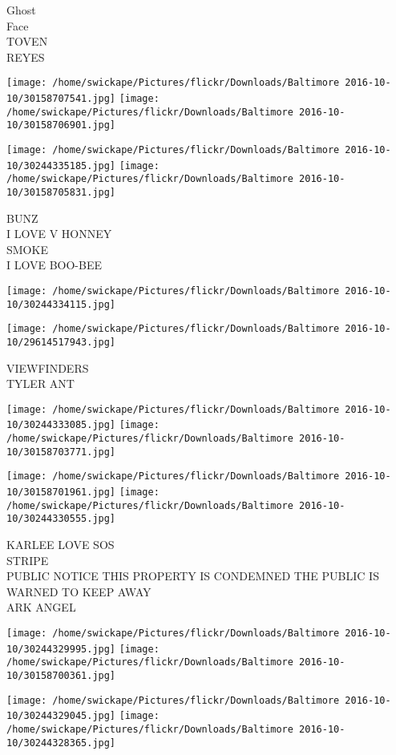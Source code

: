 \documentclass[10pt,letterpaper]{article}
\begin{document}
Ghost\\
Face\\
TOVEN\\
REYES
\pagebreak

\texttt{[image: /home/swickape/Pictures/flickr/Downloads/Baltimore 2016-10-10/30158707541.jpg]}
\texttt{[image: /home/swickape/Pictures/flickr/Downloads/Baltimore 2016-10-10/30158706901.jpg]}

\texttt{[image: /home/swickape/Pictures/flickr/Downloads/Baltimore 2016-10-10/30244335185.jpg]}
\texttt{[image: /home/swickape/Pictures/flickr/Downloads/Baltimore 2016-10-10/30158705831.jpg]}

BUNZ\\
I LOVE V HONNEY\\
SMOKE\\
I LOVE BOO{-}BEE
\pagebreak

\texttt{[image: /home/swickape/Pictures/flickr/Downloads/Baltimore 2016-10-10/30244334115.jpg]}

\vspace{0.25in}
\texttt{[image: /home/swickape/Pictures/flickr/Downloads/Baltimore 2016-10-10/29614517943.jpg]}

VIEWFINDERS\\
TYLER ANT
\pagebreak

\texttt{[image: /home/swickape/Pictures/flickr/Downloads/Baltimore 2016-10-10/30244333085.jpg]}
\texttt{[image: /home/swickape/Pictures/flickr/Downloads/Baltimore 2016-10-10/30158703771.jpg]}

\texttt{[image: /home/swickape/Pictures/flickr/Downloads/Baltimore 2016-10-10/30158701961.jpg]}
\texttt{[image: /home/swickape/Pictures/flickr/Downloads/Baltimore 2016-10-10/30244330555.jpg]}

KARLEE LOVE SOS\\
STRIPE\\
PUBLIC NOTICE THIS PROPERTY IS CONDEMNED THE PUBLIC IS WARNED TO KEEP AWAY\\
ARK ANGEL
\pagebreak

\texttt{[image: /home/swickape/Pictures/flickr/Downloads/Baltimore 2016-10-10/30244329995.jpg]}
\texttt{[image: /home/swickape/Pictures/flickr/Downloads/Baltimore 2016-10-10/30158700361.jpg]}

\texttt{[image: /home/swickape/Pictures/flickr/Downloads/Baltimore 2016-10-10/30244329045.jpg]}
\texttt{[image: /home/swickape/Pictures/flickr/Downloads/Baltimore 2016-10-10/30244328365.jpg]}
\end{document}
